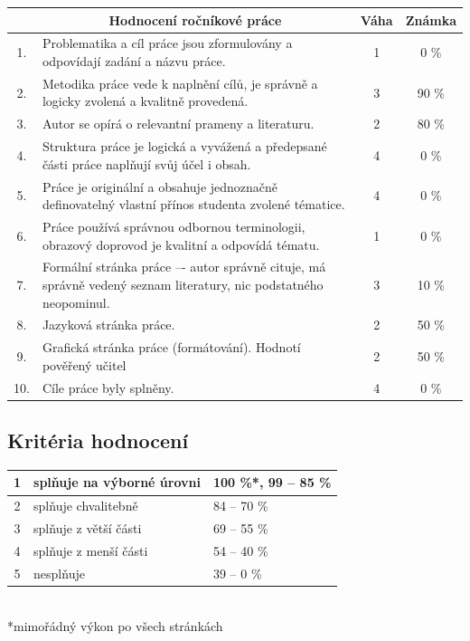 \documentclass[a4paper,10pt]{article}
\begin{document}
\begin{center}
 \begin{tabular}{c|m{}|c|c}
  & \multicolumn{1}{c|}{\textsf{Hodnocení ročníkové práce}} & \textsf{Váha} &
  \textsf{Známka}\\
  \toprule
  1. & Problematika a cíl práce jsou zformulovány a odpovídají zadání a názvu
  práce. & 1 &
  0 \%
  \\
  \midrule
  2. & Metodika práce vede k naplnění cílů, je správně a logicky zvolená a
  kvalitně provedená. & 3 &
  90 \%
  \\
  \midrule
  3. & Autor se opírá o relevantní prameny a literaturu. & 2 &
  80 \%
  \\
  \midrule
  4. & Struktura práce je logická a vyvážená a předepsané části práce naplňují
  svůj účel i obsah. & 4 &
  0 \%
  \\
  \midrule
  5. & Práce je originální a obsahuje jednoznačně definovatelný vlastní přínos
  studenta zvolené tématice. & 4 &
  0 \%
  \\
  \midrule
  6. & Práce používá správnou odbornou terminologii, obrazový doprovod je
  kvalitní a odpovídá tématu. & 1 &
  0 \%
  \\
  \midrule
  7. & Formální stránka práce –- autor správně cituje, má správně vedený seznam
  literatury, nic podstatného neopominul. & 3 &
  10 \%
  \\
  \midrule
  8. & Jazyková stránka práce. & 2 &
  50 \%
  \\
  \midrule
  9. & Grafická stránka práce (formátování). Hodnotí pověřený učitel & 2 &
  50 \%
  \\
  \midrule
  10. & Cíle práce byly splněny. & 4 &
  0 \%
 \end{tabular}
\end{center}

\begin{center}
\end{center}

\subsection*{\sffamily\centering Kritéria hodnocení}
\begin{center}
 \begin{tabular}{c|l|l}
  1 & splňuje na výborné úrovni & 100 \%*, 99 -- 85 \% \\
  \midrule
  2 & splňuje chvalitebně & 84 -- 70 \% \\
  \midrule
  3 & splňuje z větší části & 69 -- 55 \% \\
  \midrule
  4 & splňuje z menší části & 54 -- 40 \% \\
  \midrule
  5 & nesplňuje & 39 -- 0 \%
 \end{tabular}\\
 *\footnotesize{mimořádný výkon po všech stránkách}
\end{center}
\end{document}
